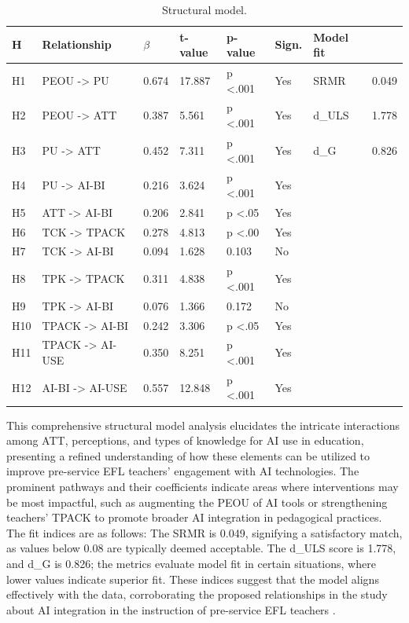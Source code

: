 \documentclass[english]{textolivre}
\begin{document}
\begin{table}[h!]
\centering
\begin{threeparttable}
\caption{Structural model.}
\label{tbl5}
\begin{tabular}{llllllll}
\toprule
H & Relationship & $\beta$ & t-value & p-value & Sign. & Model fit & \\
\midrule
H1 & PEOU -\textgreater{} PU & 0.674 & 17.887 & p \textless.001 & Yes &
SRMR & 0.049  \\
H2 & PEOU -\textgreater{} ATT & 0.387 & 5.561 & p \textless.001 & Yes &
d\_ULS & 1.778  \\
H3 & PU -\textgreater{} ATT & 0.452 & 7.311 & p \textless.001 & Yes &
d\_G & 0.826  \\
H4 & PU -\textgreater{} AI-BI & 0.216 & 3.624 & p \textless.001 & Yes &
& \\
H5 & ATT -\textgreater{} AI-BI & 0.206 & 2.841 & p \textless.05 & Yes &
& \\
H6 & TCK -\textgreater{} TPACK & 0.278 & 4.813 & p \textless.00 & Yes &
& \\
H7 & TCK -\textgreater{} AI-BI & 0.094 & 1.628 & 0.103 & No & & \\
H8 & TPK -\textgreater{} TPACK & 0.311 & 4.838 & p \textless.001 & Yes &
& \\
H9 & TPK -\textgreater{} AI-BI & 0.076 & 1.366 & 0.172 & No & & \\
H10 & TPACK -\textgreater{} AI-BI & 0.242 & 3.306 & p \textless.05 & Yes
& & \\
H11 & TPACK -\textgreater{} AI-USE & 0.350 & 8.251 & p \textless.001 &
Yes & & \\
H12 & AI-BI -\textgreater{} AI-USE & 0.557 & 12.848 & p \textless.001 &
Yes & & \\
\bottomrule
\end{tabular}
\end{threeparttable}
\end{table}

This comprehensive structural model analysis elucidates the intricate interactions among ATT, perceptions, and types of knowledge for AI use in education, presenting a refined understanding of how these elements can be utilized to improve pre-service EFL teachers’ engagement with AI technologies. The prominent pathways and their coefficients indicate areas where interventions may be most impactful, such as augmenting the PEOU of AI tools or strengthening teachers’ TPACK to promote broader AI integration in pedagogical practices. The fit indices are as follows: The SRMR is 0.049, signifying a satisfactory match, as values below 0.08 are typically deemed acceptable. The d\_ULS score is 1.778, and d\_G is 0.826; the metrics evaluate model fit in certain situations, where lower values indicate superior fit. These indices suggest that the model aligns effectively with the data, corroborating the proposed relationships in the study about AI integration in the instruction of pre-service EFL teachers \cite{magno2022pls,schuberth2023fit}.
\end{document}
